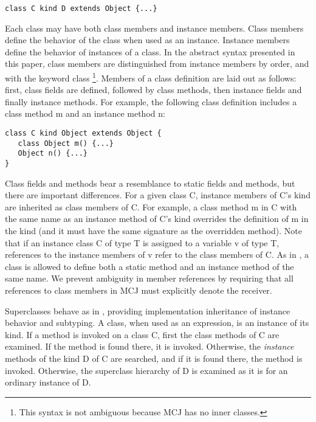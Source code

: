 \documentclass{acm-sigplan}
\begin{document}
\begin{verbatim}
class C kind D extends Object {...}
\end{verbatim}

Each class may have both class members and instance members. Class
members define the behavior of the class when used as an
instance. Instance members define the behavior of instances of a
class.  In the abstract syntax presented in this paper, class members
are distinguished from instance members by order, and with the keyword
{\txt class} \footnote{This syntax is not ambiguous because MCJ has no
inner classes.}.  Members of a class definition are laid out as
follows: first, class fields are defined, followed by class methods,
then instance fields and finally instance methods.  For example, the
following class definition includes a class method {\txt m} and an
instance method {\txt n}:

\begin{verbatim}
class C kind Object extends Object {
   class Object m() {...}
   Object n() {...}
}
\end{verbatim}

Class fields and methods bear a resemblance to static fields and
methods, but there are important differences. For a given class {\txt
C}, instance members of {\txt C}'s kind are inherited as class
members of {\txt C}. For example, a class method {\txt m} in {\txt C}
with the same name as an instance method of {\txt C}'s kind
overrides the definition of {\txt m} in the kind (and it must have the
same signature as the overridden method). Note that if an instance
class {\txt C} of type {\txt T} is assigned to a variable {\txt v} of
type {\txt T}, references to the instance members of {\txt v} refer to
the class members of {\txt C}.  As in \cite{DimUnits}, a class is
allowed to define both a static method and an instance method of the
same name. We prevent ambiguity in member references by requiring that
all references to class members in MCJ must explicitly denote the
receiver.

Superclasses behave as in \FGJ, providing implementation inheritance
of instance behavior and subtyping. A class, when used as an
expression, is an instance of its kind.  If a method is invoked on a
class {\txt C}, first the class methods of {\txt C} are examined.  If
the method is found there, it is invoked. Otherwise, the
\emph{instance} methods of the kind {\txt D} of {\txt C} are searched,
and if it is found there, the method is invoked.  Otherwise, the
superclass hierarchy of {\txt D} is examined as it is for an ordinary
instance of {\txt D}.
\end{document}
